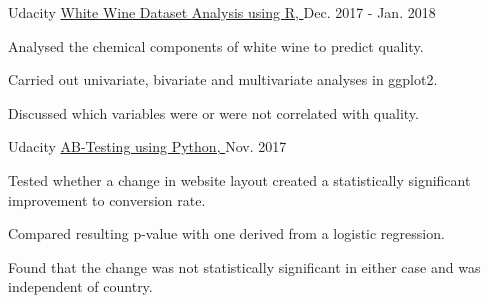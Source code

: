 

\begin{cventries}


  \cventry
    {Udacity} %
    {\href{https://github.com/SThornewillvE/Udacity-Project---Exploring-Wine-Data}{White Wine Dataset Analysis using R, }} %
    {} %
    {Dec. 2017 - Jan. 2018} %
    {
    \begin{cvitems} %
      \item {Analysed the chemical components of white wine to predict quality.}
      \item {Carried out univariate, bivariate and multivariate analyses in ggplot2.}
      \item {Discussed which variables were or were not correlated with quality.}
    \end{cvitems}
    }


  \cventry
    {Udacity} %
    {\href{https://github.com/SThornewillvE/Udacity-Project---AB-testing}{AB-Testing using Python, }} %
    {} %
    {Nov. 2017} %
    {
    \begin{cvitems} %
      \item {Tested whether a change in website layout created a statistically significant improvement to conversion rate.}
      \item {Compared resulting p-value with one derived from a logistic regression.}
      \item {Found that the change was not statistically significant in either case and was independent of country.}
    \end{cvitems}
    }



\end{cventries}
